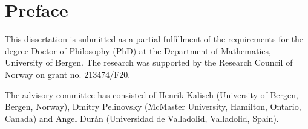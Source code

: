 \chapter{Preface}

This dissertation is submitted as a partial fulfillment of the requirements for the degree Doctor of Philosophy (PhD) at the Department of Mathematics, University of Bergen. The research was
supported by the Research Council of Norway on grant no. 213474/F20. 




The advisory committee has consisted of Henrik Kalisch (University of Bergen, Bergen, Norway),  Dmitry Pelinovsky (McMaster University, Hamilton, Ontario, Canada) and Angel Dur\'an (Universidad de Valladolid, Valladolid, Spain).

